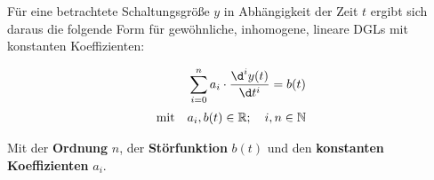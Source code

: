 \begin{frame}
{    Für eine betrachtete Schaltungsgröße $y$ in Abhängigkeit der Zeit $t$ ergibt sich daraus 
    die folgende Form für gewöhnliche, inhomogene, lineare DGLs mit konstanten Koeffizienten:

    \begin{align}\label{eq:grundlagen:dgl:inhomogen}
        \sum_{i=0}^{n} a_i \cdot \frac{\d^i y(t)}{\d t^i} = b(t)\\[2pt]\nonumber
        \text{mit} \quad a_i, b(t) \in \mathbb{R}; \quad i, n \in \mathbb{N}
    \end{align}

    Mit der \textbf{Ordnung} $n$, 
    der \textbf{Störfunktion} $b(t)$ und den \textbf{konstanten Koeffizienten} $a_i$. 

}
\end{frame}
